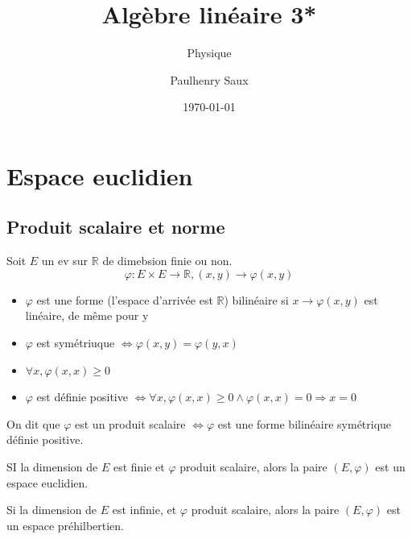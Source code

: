 \documentclass[french]{yLectureNote}
\title{Algèbre linéaire 3*}
\subtitle{Physique}
\author{Paulhenry Saux}
\date{\today}
\newcommand{\R}[0]{\mathbb{R}}
\begin{document}
\chapter{Espace euclidien}


\section{Produit scalaire et norme}
\begin{definition}
    Soit $E$ un ev sur $\R$ de dimebsion finie ou non.
    $$\varphi : E\times E \to \R, (x,y)\to \varphi(x,y)$$
    \begin{itemize}
        \item $\varphi$ est une forme (l'espace d'arrivée est $\R$) bilinéaire si $x\to \varphi(x,y)$ est linéaire, de m\^eme pour y
        \item $\varphi$ est symétriuque $\iff \varphi(x,y) = \varphi(y,x)$
        \item $\forall x, \varphi(x,x) \geq0$
        \item $\varphi$ est définie positive $\iff \forall x, \varphi(x,x)\geq 0 \wedge \varphi(x,x) = 0 \Rightarrow x=0$
    \end{itemize}
    On dit que $\varphi$ est un produit scalaire $\iff \varphi$ est une forme bilinéaire symétrique définie positive.
\end{definition}
\begin{definition}
    SI la dimension de $E$ est finie et $\varphi$ produit scalaire, alors la paire $(E,\varphi)$ est un espace euclidien.

\end{definition}
\begin{definition}
        Si la dimension de $E$ est infinie, et $\varphi$ produit scalaire, alors la paire $(E,\varphi)$ est un espace préhilbertien.
\end{definition}
\end{document}
